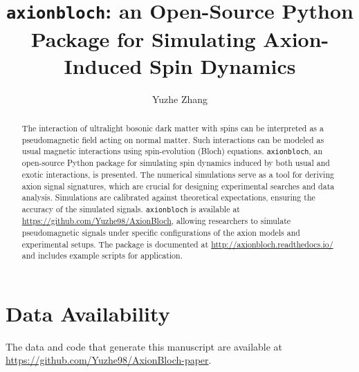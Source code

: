 \documentclass[%
 reprint,
nofootinbib,
 amsmath,amssymb,
 aps,
]{revtex4-2}
\newcommand{\code}{\texttt}
\newcommand{\axionbloch}{\code{axionbloch}}
\begin{document}

\title{\axionbloch{}: an Open-Source Python Package for Simulating Axion-Induced Spin Dynamics}

\author{Yuzhe Zhang}

\begin{abstract}

The interaction of ultralight bosonic dark matter with spins can be interpreted as a pseudomagnetic field acting on normal matter.
Such interactions can be modeled as usual magnetic interactions using spin-evolution (Bloch) equations.
\axionbloch{}, an open-source Python package for simulating spin dynamics induced by both usual and exotic interactions, is presented. 
The numerical simulations serve as a tool for deriving axion signal signatures, which are crucial for designing experimental searches and data analysis. 
Simulations are calibrated against theoretical expectations, ensuring the accuracy of the simulated signals. 
\axionbloch{} is available at \url{https://github.com/Yuzhe98/AxionBloch}, allowing researchers to simulate pseudomagnetic signals under specific configurations of the axion models and experimental setups. 
The package is documented at \url{http://axionbloch.readthedocs.io/} and includes example scripts for application. 

\end{abstract}

\maketitle



\section*{Data Availability}
\label{sec:data-availability}
The data and code that generate this manuscript are available at \url{
https://github.com/Yuzhe98/AxionBloch-paper}. 
\end{document}
